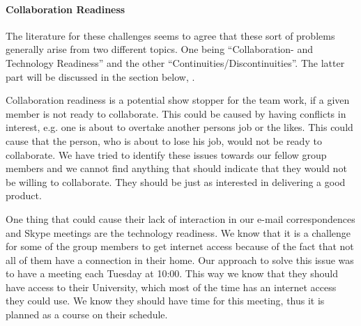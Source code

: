 \paragraph{Collaboration Readiness} \label{par:collaborationreadiness}
The literature for these challenges seems to agree that these sort of problems generally arise from two different topics. One being ``Collaboration- and Technology Readiness'' and the other ``Continuities/Discontinuities''. The latter part will be discussed in the section below, .

Collaboration readiness is a potential show stopper for the team work, if a given member is not ready to collaborate. This could be caused by having conflicts in interest, e.g. one is about to overtake another persons job or the likes. This could cause that the person, who is about to lose his job, would not be ready to collaborate. We have tried to identify these issues towards our fellow group members and we cannot find anything that should indicate that they would not be willing to collaborate. They should be just as interested in delivering a good product. 

One thing that could cause their lack of interaction in our e-mail correspondences and Skype meetings are the technology readiness. We know that it is a challenge for some of the group members to get internet access because of the fact that not all of them have a connection in their home. Our approach to solve this issue was to have a meeting each Tuesday at 10:00. This way we know that they should have access to their University, which most of the time has an internet access they could use. We know they should have time for this meeting, thus it is planned as a course on their schedule.

